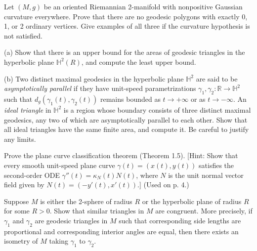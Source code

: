 \begin{exercise}
\label{prob:geodesic-polygons-negative-curvature}
Let $(M, g)$ be an oriented Riemannian 2-manifold with nonpositive Gaussian curvature everywhere. Prove that there are no geodesic polygons with exactly 0, 1, or 2 ordinary vertices. Give examples of all three if the curvature hypothesis is not satisfied.
\end{exercise}

\begin{exercise}
\label{prob:ideal-triangles-hyperbolic}
(a) Show that there is an upper bound for the areas of geodesic triangles in
the hyperbolic plane $\mathbb{H}^2(R)$, and compute the least upper bound.

(b) Two distinct maximal geodesics in the hyperbolic plane $\mathbb{H}^2$ are said to be
\textit{asymptotically parallel} if they have unit-speed parametrizations $\gamma_1, \gamma_2:
\mathbb{R} \to \mathbb{H}^2$ such that $d_g(\gamma_1(t), \gamma_2(t))$ remains bounded as $t \to +\infty$ or as
$t \to -\infty$. An \textit{ideal triangle} in $\mathbb{H}^2$ is a region whose boundary consists of
three distinct maximal geodesics, any two of which are asymptotically parallel to each other. Show that all ideal triangles have the same finite
area, and compute it. Be careful to justify any limits.
\end{exercise}

\begin{exercise}
\label{prob:plane-curve-classification}
Prove the plane curve classification theorem (Theorem 1.5). [Hint: Show that
every smooth unit-speed plane curve $\gamma(t) = (x(t), y(t))$ satisfies the second-order ODE $\gamma''(t) = \kappa_N(t) N(t)$, where $N$ is the unit normal vector field given
by $N(t) = (-y'(t), x'(t))$.] (Used on p. 4.)
\end{exercise}

\begin{exercise}
\label{prob:similar-triangles-congruent}
Suppose $M$ is either the 2-sphere of radius $R$ or the hyperbolic plane of
radius $R$ for some $R > 0$. Show that similar triangles in $M$ are congruent.
More precisely, if $\gamma_1$ and $\gamma_2$ are geodesic triangles in $M$ such that corresponding side lengths are proportional and corresponding interior angles are
equal, then there exists an isometry of $M$ taking $\gamma_1$ to $\gamma_2$.
\end{exercise}

